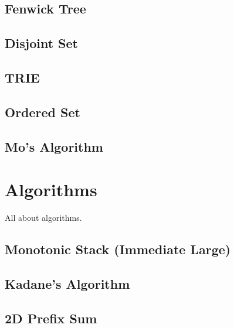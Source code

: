 \documentclass[10pt, a4paper]{article}
\begin{document}
\begin{multicols}{2}
\subsection{Fenwick Tree}


\subsection{Disjoint Set}


\subsection{TRIE}


\subsection{Ordered Set}


\subsection{Mo's Algorithm}


\section{Algorithms}
All about algorithms.

\subsection{Monotonic Stack (Immediate \allowbreak Large)}


\subsection{Kadane’s Algorithm}


\subsection{2D Prefix Sum}



\end{multicols}
\end{document}
